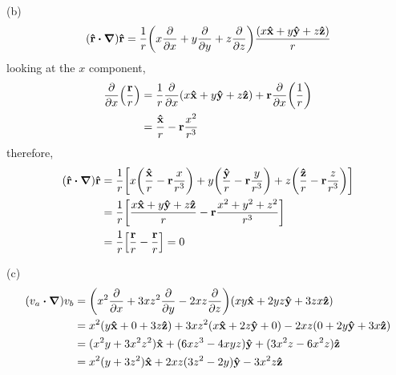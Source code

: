 \documentclass[../main.tex]{subfiles}
\begin{document}
(b) 
\begin{align*}
    (\vu{r} \vdot \grad) \vu{r} &= \frac{1}{r} \qt(x\pdv{x} + y\pdv{y} + z\pdv{z})
        \frac{(x\vu{x} + y\vu{y} + z\vu{z})}{r} \\
\end{align*}
looking at the $x$ component,
\begin{align*}
    \pdv{x}(\frac{\vb{r}}{r}) &= \frac{1}{r} \pdv{x}(x\vu{x} + y\vu{y} + z\vu{z})
    + \vb{r} \pdv{x}(\frac{1}{r}) \\
    &= \frac{\vu{x}}{r} - \vb{r} \frac{x^2}{r^3}
\end{align*}
therefore,
\begin{align*}
    (\vu{r} \vdot \grad) \vu{r} &= \frac{1}{r} \qt[
        x\qt(\frac{\vu{x}}{r} - \vb{r} \frac{x}{r^3})
        + y\qt(\frac{\vu{y}}{r} - \vb{r} \frac{y}{r^3})
        + z\qt(\frac{\vu{z}}{r} - \vb{r} \frac{z}{r^3})] \\
    &= \frac{1}{r} \qt[
        \frac{x\vu{x} + y\vu{y} + z\vu{z}}{r} - \vb{r} \frac{x^2 + y^2 + z^2}{r^3}] \\
    &= \frac{1}{r} \qt[\frac{\vb{r}}{r} - \frac{\vb{r}}{r}] = 0
\end{align*}

(c)
\begin{align*}
    (v_a \vdot \grad) v_b &= \qt(x^2\pdv{x} + 3xz^2\pdv{y} - 2xz\pdv{z}) 
        (xy\vu{x} + 2yz\vu{y} + 3zx\vu{z}) \\
    &= x^2(y\vu{x} + 0 + 3z\vu{z}) + 3xz^2(x\vu{x} + 2z\vu{y} + 0) - 2xz(0 + 2y\vu{y} + 3x\vu{z})\\
    &= (x^2y + 3x^2z^2)\vu{x} + (6xz^3 - 4xyz)\vu{y} + (3x^2z - 6x^2z)\vu{z} \\
    &= x^2(y + 3z^2) \vu{x} + 2xz(3z^2 - 2y) \vu{y} - 3x^2z \vu{z}
\end{align*}
\end{document}
